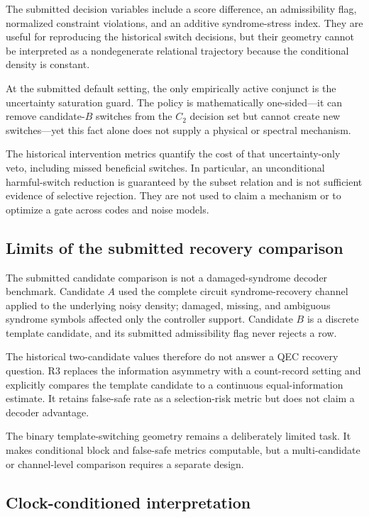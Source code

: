 \documentclass{iopjournal}
\begin{document}
The submitted decision variables include a score difference, an admissibility
flag, normalized constraint violations, and an additive syndrome-stress index.
They are useful for reproducing the historical switch decisions, but their
geometry cannot be interpreted as a nondegenerate relational trajectory because
the conditional density is constant.

At the submitted default setting, the only empirically active conjunct is the
uncertainty saturation guard.  The policy is mathematically one-sided---it can
remove candidate-$B$ switches from the $C_2$ decision set but cannot create new
switches---yet this fact alone does not supply a physical or spectral mechanism.

The historical intervention metrics quantify the cost of that uncertainty-only
veto, including missed beneficial switches. In particular, an unconditional
harmful-switch reduction is guaranteed by the subset relation and is not
sufficient evidence of selective rejection.  They are not used to claim a
mechanism or to optimize a gate across codes and noise models.

\subsection{Limits of the submitted recovery comparison}
\label{subsec:discussion-recovery-control}

The submitted candidate comparison is not a damaged-syndrome decoder benchmark.
Candidate $A$ used the complete circuit syndrome-recovery channel applied to the
underlying noisy density; damaged, missing, and ambiguous syndrome symbols
affected only the controller support.  Candidate $B$ is a discrete template
candidate, and its submitted admissibility flag never rejects a row.

The historical two-candidate values therefore do not answer a QEC recovery
question.  R3 replaces the information asymmetry with a count-record setting and
explicitly compares the template candidate to a continuous equal-information
estimate.  It retains false-safe rate as a selection-risk metric but does not
claim a decoder advantage.

The binary template-switching geometry remains a deliberately limited task.  It
makes conditional block and false-safe metrics computable, but a multi-candidate
or channel-level comparison requires a separate design.

\subsection{Clock-conditioned interpretation}
\label{subsec:discussion-background-independent}
\end{document}
